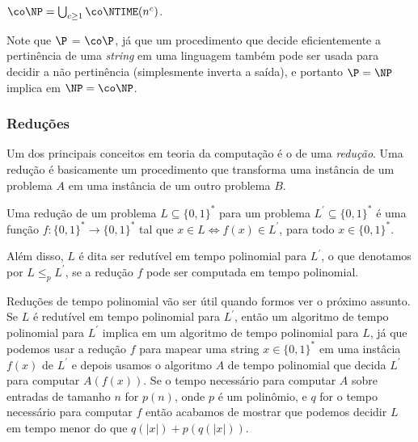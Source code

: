 \begin{defi} [A classe $\co\NP$]

$\co\NP = \bigcup_{c \geq 1} \co\NTIME(n^{c})$.

\end{defi}

Note que $\P$ = $\co\P$, já que um procedimento que decide eficientemente a pertinência de uma \emph{string} em uma linguagem também pode ser usada para decidir a não pertinência (simplesmente inverta a saída), e portanto $\P = \NP$ implica em $\NP = \co\NP$.

\subsubsection{Reduções}

Um dos principais conceitos em teoria da computação é o de uma \emph{redução}. Uma redução é basicamente um procedimento que transforma uma instância de um problema $A$ em uma instância de um outro problema $B$.

\begin{defi} [Reduções] \label{defi:reducoes}

Uma redução de um problema $L \subseteq \{0, 1\}^{*}$ para um problema $L^{\prime} \subseteq \{0, 1\}^{*}$ é uma função $f: \{0, 1\}^{*} \to \{0, 1\}^{*}$ tal que $x \in L \iff f(x) \in L^{\prime}$, para todo $x \in \{0, 1\}^{*}$.

Além disso, $L$ é dita ser redutível em tempo polinomial para $L^{\prime}$, o que denotamos por $L \leq_{p} L^{\prime}$, se a redução $f$ pode ser computada em tempo polinomial.

\end{defi}

Reduções de tempo polinomial vão ser útil quando formos ver o próximo assunto. Se $L$ é redutível em tempo polinomial para $L^{\prime}$, então um algoritmo de tempo polinomial para $L^{\prime}$ implica em um algoritmo de tempo polinomial para $L$, já que podemos usar a redução $f$ para mapear uma string $x \in \{0, 1\}^{*}$ em uma instâcia $f(x)$ de $L^{\prime}$ e depois usamos o algoritmo $A$ de tempo polinomial que decida $L^{\prime}$ para computar $A(f(x))$. Se o tempo necessário para computar $A$ sobre entradas de tamanho $n$ for $p(n)$, onde $p$ é um polinômio, e $q$ for o tempo necessário para computar $f$ então acabamos de mostrar que podemos decidir $L$ em tempo menor do que $q(\lvert x \rvert) + p(q(\lvert x \rvert))$. 


